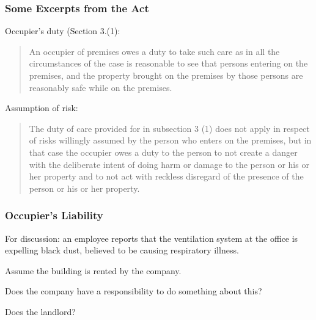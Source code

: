 \begin{frame}
\frametitle{Some Excerpts from the Act}

Occupier's duty (Section 3.(1): 
\begin{quote}
An occupier of premises owes a duty to take such care as in all the circumstances of the case is reasonable to see that persons entering on the premises, and the property brought on the premises by those persons are reasonably safe while on the premises.
\end{quote}


Assumption of risk:
\begin{quote}
The duty of care provided for in subsection 3 (1) does not apply in respect of risks willingly assumed by the person who enters on the premises, but in that case the occupier owes a duty to the person to not create a danger with the deliberate intent of doing harm or damage to the person or his or her property and to not act with reckless disregard of the presence of the person or his or her property.
\end{quote}


\end{frame}


\begin{frame}
\frametitle{Occupier's Liability}

For discussion: an employee reports that the ventilation system at the office is expelling black dust, believed to be causing respiratory illness.

Assume the building is rented by the company.

Does the company have a responsibility to do something about this?

Does the landlord?


\end{frame}




